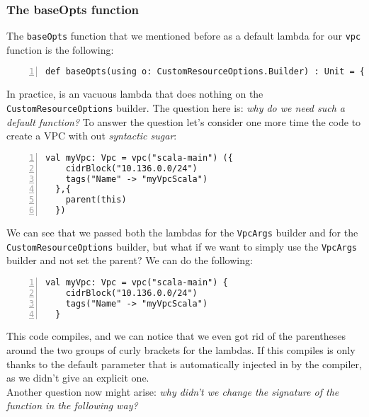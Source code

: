 \subsubsection{The baseOpts function}
The \texttt{baseOpts} function that we mentioned before as a default lambda for our \texttt{vpc} function is the following:\\
\begin{minipage}{\linewidth}
\begin{lstlisting}[numbers=left, numberstyle=\tiny, numbersep=-5pt, stepnumber=1]
  def baseOpts(using o: CustomResourceOptions.Builder) : Unit = {}
\end{lstlisting}
\end{minipage}
In practice, is an vacuous lambda that does nothing on the \texttt{CustomResourceOptions} builder.
The question here is: \textit{why do we need such a default function?}
To answer the question let's consider one more time the code to create a VPC with out \textit{syntactic sugar}:\\
\begin{minipage}{\linewidth}
\begin{lstlisting}[numbers=left, numberstyle=\tiny, numbersep=-5pt, stepnumber=1]
  val myVpc: Vpc = vpc("scala-main") ({
    cidrBlock("10.136.0.0/24")
    tags("Name" -> "myVpcScala")
  },{
    parent(this)
  })
\end{lstlisting}
\end{minipage}
We can see that we passed both the lambdas for the \texttt{VpcArgs} builder and for the \texttt{CustomResourceOptions} builder, but what if we want to simply use the \texttt{VpcArgs} builder and not set the parent?
We can do the following:\\
\begin{minipage}{\linewidth}
\begin{lstlisting}[numbers=left, numberstyle=\tiny, numbersep=-5pt, stepnumber=1]
  val myVpc: Vpc = vpc("scala-main") {
    cidrBlock("10.136.0.0/24")
    tags("Name" -> "myVpcScala")
  }
\end{lstlisting}
\end{minipage}
This code compiles, and we can notice that we even got rid of the parentheses around the two groups of curly brackets for the lambdas.
If this compiles is only thanks to the default parameter that is automatically injected in by the compiler, as we didn't give an explicit one.\\
Another question now might arise: \textit{why didn't we change the signature of the function in the following way?}\\
